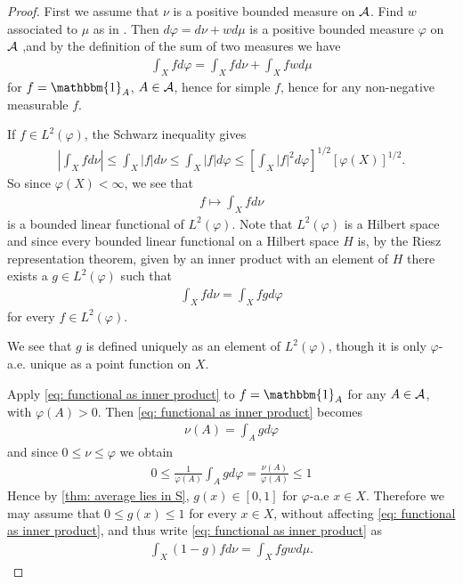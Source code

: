 \begin{proof}
First we assume that $\nu$ is a positive bounded measure on $\mathcal{A}$. Find $w$ associated to $\mu$ as in . Then $d\varphi=d\nu+wd\mu$ is a positive bounded measure $\varphi$ on $\mathcal{A}$ ,and by the definition of the sum of two measures we have
\begin{align*}
	\int_{X}fd\varphi = \int_{X}fd\nu + \int_{X}fwd\mu
\end{align*}
for $f=\mathbbm{1}_{A}$, $A\in \mathcal{A}$, hence for simple $f$, hence for any non-negative measurable $f$.

If $f\in L^{2}(\varphi)$, the Schwarz inequality gives
\begin{align*}
	\left|\int_{X}fd\nu \right| \le \int_{X} |f|d\nu \le \int_{X}|f|d\varphi \le \left[ \int_{X}|f|^{2}d\varphi \right]^{1/2} [\varphi(X)]^{1/2}.
\end{align*}
So since $\varphi(X)<\infty$, we see that
\begin{align*}
	f\mapsto \int_{X}fd\nu
\end{align*}
is a bounded linear functional of $L^{2}(\varphi)$. Note that $L^{2}(\varphi)$ is a Hilbert space and since every bounded linear functional on a Hilbert space $H$ is, by the Riesz representation theorem, given by an inner product with an element of $H$ there exists a $g\in L^{2}(\varphi)$ such that
\begin{align}
	\int_{X}fd\nu=\int_{X}fgd\varphi \label{eq: functional as inner product}
\end{align}
for every $f\in L^{2}(\varphi)$.

We see that $g$ is defined uniquely as an element of $L^{2}(\varphi)$, though it is only $\varphi$-a.e. unique as a point function on $X$.

Apply \eqref{eq: functional as inner product} to $f=\mathbbm{1}_{A}$ for any $A\in \mathcal{A}$, with $\varphi(A)>0$. Then \eqref{eq: functional as inner product} becomes
\begin{align*}
	\nu(A)=\int_{A}gd\varphi
\end{align*}
and since $0\le \nu \le \varphi$ we obtain
\begin{align*}
	0\le \frac{1}{\varphi(A)}\int_{A}gd\varphi=\frac{\nu(A)}{\varphi(A)}\le 1
\end{align*}
Hence by \cref{thm: average lies in S}, $g(x)\in [0,1]$ for $\varphi$-a.e $x\in X$.
Therefore we may assume that $0\le g(x) \le 1$ for every $x\in X$, without affecting \eqref{eq: functional as inner product}, and thus write \eqref{eq: functional as inner product} as
\begin{align}
	\int_{X}(1-g)fd\nu=\int_{X}fgwd\mu. \label{eq: rewriting}
\end{align}


\end{proof}
